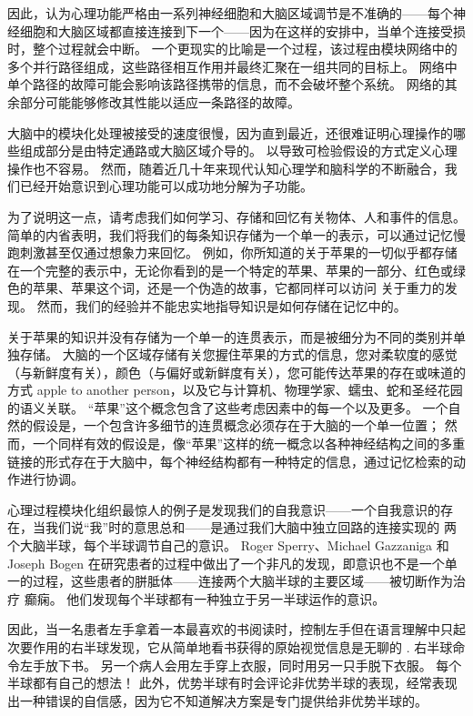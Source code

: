 因此，认为心理功能严格由一系列神经细胞和大脑区域调节是不准确的——每个神经细胞和大脑区域都直接连接到下一个——因为在这样的安排中，当单个连接受损时，整个过程就会中断。 
一个更现实的比喻是一个过程，该过程由模块网络中的多个并行路径组成，这些路径相互作用并最终汇聚在一组共同的目标上。 
网络中单个路径的故障可能会影响该路径携带的信息，而不会破坏整个系统。 
网络的其余部分可能能够修改其性能以适应一条路径的故障。


大脑中的模块化处理被接受的速度很慢，因为直到最近，还很难证明心理操作的哪些组成部分是由特定通路或大脑区域介导的。 
以导致可检验假设的方式定义心理操作也不容易。 
然而，随着近几十年来现代认知心理学和脑科学的不断融合，我们已经开始意识到心理功能可以成功地分解为子功能。


为了说明这一点，请考虑我们如何学习、存储和回忆有关物体、人和事件的信息。 
简单的内省表明，我们将我们的每条知识存储为一个单一的表示，可以通过记忆慢跑刺激甚至仅通过想象力来回忆。 
例如，你所知道的关于苹果的一切似乎都存储在一个完整的表示中，无论你看到的是一个特定的苹果、苹果的一部分、红色或绿色的苹果、苹果这个词，还是一个伪造的故事，它都同样可以访问 关于重力的发现。 
然而，我们的经验并不能忠实地指导知识是如何存储在记忆中的。


关于苹果的知识并没有存储为一个单一的连贯表示，而是被细分为不同的类别并单独存储。 
大脑的一个区域存储有关您握住苹果的方式的信息，您对柔软度的感觉（与新鲜度有关），颜色（与偏好或新鲜度有关），您可能传达苹果的存在或味道的方式 apple to another person，以及它与计算机、物理学家、蠕虫、蛇和圣经花园的语义关联。 
“苹果”这个概念包含了这些考虑因素中的每一个以及更多。 
一个自然的假设是，一个包含许多细节的连贯概念必须存在于大脑的一个单一位置； 
然而，一个同样有效的假设是，像“苹果”这样的统一概念以各种神经结构之间的多重链接的形式存在于大脑中，每个神经结构都有一种特定的信息，通过记忆检索的动作进行协调。


心理过程模块化组织最惊人的例子是发现我们的自我意识——一个自我意识的存在，当我们说“我”时的意思总和——是通过我们大脑中独立回路的连接实现的 两个大脑半球，每个半球调节自己的意识。 
Roger Sperry、Michael Gazzaniga 和 Joseph Bogen 在研究患者的过程中做出了一个非凡的发现，即意识也不是一个单一的过程，这些患者的胼胝体——连接两个大脑半球的主要区域——被切断作为治疗 癫痫。 
他们发现每个半球都有一种独立于另一半球运作的意识。


因此，当一名患者左手拿着一本最喜欢的书阅读时，控制左手但在语言理解中只起次要作用的右半球发现，它从简单地看书获得的原始视觉信息是无聊的 . 右半球命令左手放下书。 
另一个病人会用左手穿上衣服，同时用另一只手脱下衣服。 每个半球都有自己的想法！ 
此外，优势半球有时会评论非优势半球的表现，经常表现出一种错误的自信感，因为它不知道解决方案是专门提供给非优势半球的。


